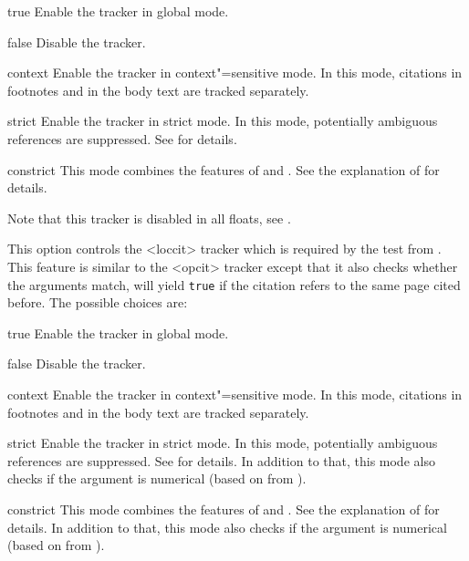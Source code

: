 \documentclass{ltxdockit}[2011/03/25]
\begin{document}
\begin{optionlist}
\begin{valuelist}
\item[true] Enable the tracker in global mode.
\item[false] Disable the tracker.
\item[context] Enable the tracker in context"=sensitive mode. In this mode, citations in footnotes and in the body text are tracked separately.
\item[strict] Enable the tracker in strict mode. In this mode, potentially ambiguous references are suppressed. See  for details.
\item[constrict] This mode combines the features of  and . See the explanation of  for details.
\end{valuelist}

Note that this tracker is disabled in all floats, see .


This option controls the <loccit> tracker which is required by the  test from . This feature is similar to the <opcit> tracker except that it also checks whether the  arguments match, \ie {} will yield \texttt{true} if the citation refers to the same page cited before. The possible choices are:

\begin{valuelist}
\item[true] Enable the tracker in global mode.
\item[false] Disable the tracker.
\item[context] Enable the tracker in context"=sensitive mode. In this mode, citations in footnotes and in the body text are tracked separately.
\item[strict] Enable the tracker in strict mode. In this mode, potentially ambiguous references are suppressed. See  for details. In addition to that, this mode also checks if the  argument is numerical (based on  from ).
\item[constrict] This mode combines the features of  and . See the explanation of  for details. In addition to that, this mode also checks if the  argument is numerical (based on  from ).
\end{valuelist}


\end{optionlist}
\end{document}
